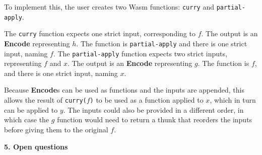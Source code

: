 \documentclass{article}
\newcommand{\encode}{\textbf{Encode}\xspace}
\newcommand{\encodes}{\textbf{Encode}s\xspace}
\begin{document}
To implement this, the user creates two Wasm functions: \texttt{curry} and \texttt{partial-apply}.

The \texttt{curry} function expects one strict input, corresponding to
$f$.  The output is an \encode representing $h$. The function is
\texttt{partial-apply} and there is one strict input, naming $f$. The
\texttt{partial-apply} function expects two strict inputs,
representing $f$ and $x$. The output is an \encode representing
$g$. The function is $f$, and there is one strict input, naming $x$.

Because \encodes can be used as functions and the inputs are appended,
this allows the result of \texttt{curry($f$)} to be used as a function
applied to $x$, which in turn can be applied to $y$. The inputs could
also be provided in a different order, in which case the $g$ function would
need to return a thunk that reorders the inputs before giving them to
the original $f$.

\vspace{0.5\baselineskip}
{\Large \textbf{5. Open questions}}
\end{document}
